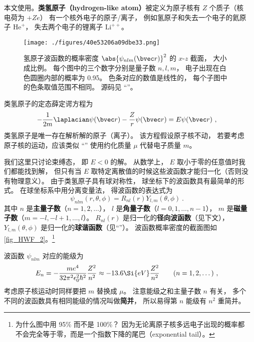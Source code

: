 

本文使用。\textbf{类氢原子（hydrogen-like atom）}被定义为原子核有 $Z$ 个质子（核电荷为 $+Ze$） 有一个核外电子的原子/离子， 例如氢原子和失去一个电子的氦原子 $\mathrm{He}^+$， 失去两个电子的锂离子 $\mathrm{Li}^{++}$。 %

\begin{figure}[ht]
\centering
\texttt{[image: ./figures/40e53206a09dbe33.png]}
\caption{氢原子波函数的概率密度 $\abs{\psi_{nlm}(\bvec r)}^2$ 的 $x$-$z$ 截面， 大小成比例。 每个图中的三个数字分别是量子数 $n, l, m$， 电子出现在白色圆圈内部的概率为 0.95。 色条对应的数值是线性的， 每个子图中的色条取值范围不相同。 源码见 “”。} \label{fig_HWF_2}
\end{figure}

类氢原子的定态薛定谔方程为
\begin{equation}\label{eq_HWF_1}
-\frac{1}{2m} \laplacian \psi(\bvec r) - \frac{Z}{r} \psi(\bvec r) = E \psi(\bvec r)~,
\end{equation}
类氢原子是唯一存在解析解的原子（离子）。 该方程假设原子核不动， 若要考虑原子核的运动，应该类似 “” 使用约化质量 $\mu$ 代替电子质量 $m$。

我们这里只讨论束缚态， 即 $E < 0$ 的解。  从数学上， $E$ 取小于零的任意值时我们都能找到解， 但只有当 $E$ 取特定离散值的时候这些波函数才能归一化（否则没有物理意义）。 由于类氢原子具有球对称性， 球坐标下的波函数具有最简单的形式。 在球坐标系中用分离变量法， 得波函数的表达式为
\begin{equation}\label{eq_HWF_3}
\psi_{nlm} (r,\theta ,\phi) = R_{nl}(r) Y_{l,m}(\theta, \phi)~.
\end{equation}
其中 $n$ 是\textbf{主量子数}（$n = 1, 2, \dots$）， $l$ 是\textbf{角量子数}（$l = 0, 1, \dots, n - 1$）， $m$ 是\textbf{磁量子数}（$m = -l, -l+1, \dots, l$）。 $R_{nl}(r)$ 是归一化的\textbf{径向波函数}（见下文）， $Y_{l,m}(\theta, \phi)$ 是归一化的\textbf{球谐函数}（见“”）。 波函数概率密度的截面图如\autoref{fig_HWF_2}。\footnote{为什么图中用 95\% 而不是 100\%？ 因为无论离原子核多远电子出现的概率都不会完全等于零，而是一个指数下降的尾巴（exponential tail）。}

波函数 $\psi_{nlm}$ 对应的能级为
\begin{equation}\label{eq_HWF_5}
E_n =  - \frac{m e^4}{32 \pi^2 \epsilon_0^2 \hbar ^2} \frac{Z^2}{n^2} \approx - 13.6\Si{eV} \frac{Z^2}{n^2}
\qquad (n = 1, 2, \dots)~,
\end{equation}
考虑原子核运动时同样要把 $m$ 替换成 $\mu$。 注意能级之和主量子数 $n$ 有关， 多个不同的波函数具有相同能级的情况叫做\textbf{简并}， 所以易得第 $n$ 能级有 $n^2$ 重简并。

